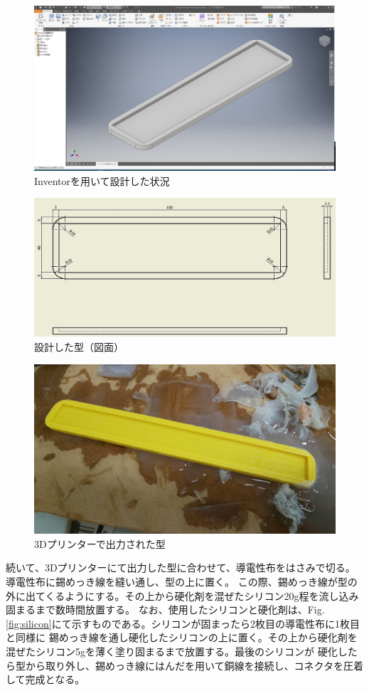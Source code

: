 \begin{figure}[h]
    \begin{center}
        \includegraphics[width=0.6\columnwidth,clip]{./2_measurement/inventor.eps}
        \caption{Inventorを用いて設計した状況}
        \label{fig:Inventor}
    \end{center}
\end{figure}
\begin{figure}[h]
    \begin{center}
        \includegraphics[width=0.6\columnwidth,clip]{./2_measurement/drowing.eps}
        \caption{設計した型（図面）}
        \label{fig:3Dprinter}
    \end{center}
\end{figure}
\begin{figure}[h]
    \begin{center}
        \includegraphics[width=0.6\columnwidth,clip]{./2_measurement/3dprint.eps}
        \caption{3Dプリンターで出力された型}
        \label{fig:3Dprinter}
    \end{center}
\end{figure}

\newpage
続いて、3Dプリンターにて出力した型に合わせて、導電性布をはさみで切る。導電性布に錫めっき線を縫い通し、型の上に置く。
この際、錫めっき線が型の外に出てくるようにする。その上から硬化剤を混ぜたシリコン20g程を流し込み固まるまで数時間放置する。
なお、使用したシリコンと硬化剤は、Fig.\ref{fig:silicon}にて示すものである。シリコンが固まったら2枚目の導電性布に1枚目と同様に
錫めっき線を通し硬化したシリコンの上に置く。その上から硬化剤を混ぜたシリコン5gを薄く塗り固まるまで放置する。最後のシリコンが
硬化したら型から取り外し、錫めっき線にはんだを用いて銅線を接続し、コネクタを圧着して完成となる。

